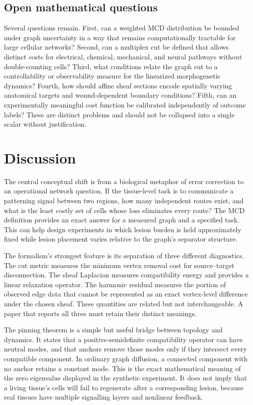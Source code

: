 \documentclass[12pt,a4paper]{article}
\begin{document}
\subsection{Open mathematical questions}
Several questions remain. First, can a weighted MCD distribution be bounded under graph uncertainty in a way that remains computationally tractable for large cellular networks? Second, can a multiplex cut be defined that allows distinct costs for electrical, chemical, mechanical, and neural pathways without double-counting cells? Third, what conditions relate the graph cut to a controllability or observability measure for the linearized morphogenetic dynamics? Fourth, how should affine sheaf sections encode spatially varying anatomical targets and wound-dependent boundary conditions? Fifth, can an experimentally meaningful cost function be calibrated independently of outcome labels? These are distinct problems and should not be collapsed into a single scalar without justification.

\section{Discussion}
The central conceptual shift is from a biological metaphor of error correction to an operational network question. If the tissue-level task is to communicate a patterning signal between two regions, how many independent routes exist, and what is the least costly set of cells whose loss eliminates every route? The MCD definition provides an exact answer for a measured graph and a specified task. This can help design experiments in which lesion burden is held approximately fixed while lesion placement varies relative to the graph's separator structure.

The formalism's strongest feature is its separation of three different diagnostics. The cut metric measures the minimum vertex removal cost for source--target disconnection. The sheaf Laplacian measures compatibility energy and provides a linear relaxation operator. The harmonic residual measures the portion of observed edge data that cannot be represented as an exact vertex-level difference under the chosen sheaf. These quantities are related but not interchangeable. A paper that reports all three must retain their distinct meanings.

The pinning theorem is a simple but useful bridge between topology and dynamics. It states that a positive-semidefinite compatibility operator can have neutral modes, and that anchors remove those modes only if they intersect every compatible component. In ordinary graph diffusion, a connected component with no anchor retains a constant mode. This is the exact mathematical meaning of the zero eigenvalue displayed in the synthetic experiment. It does not imply that a living tissue's cells will fail to regenerate after a corresponding lesion, because real tissues have multiple signalling layers and nonlinear feedback.
\end{document}
